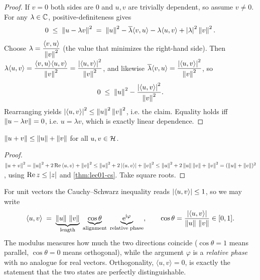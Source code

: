 \begin{proof}
If $v=0$ both sides are $0$ and $u,v$ are trivially dependent, so assume $v\neq0$.
For any $\lambda\in\mathbb{C}$, positive-definiteness gives
\[
  0\;\le\;\left\lVert u-\lambda v \right\rVert^{2}
   \;=\;\left\lVert u \right\rVert^{2}-\overline{\lambda}\langle v,u\rangle-\lambda\langle u,v\rangle+\left\lvert \lambda \right\rvert^{2}\left\lVert v \right\rVert^{2}.
\]
Choose $\lambda=\dfrac{\langle v,u\rangle}{\left\lVert v \right\rVert^{2}}$ (the value that minimizes the
right-hand side). Then $\lambda\langle u,v\rangle=\dfrac{\langle v,u\rangle\langle u,v\rangle}{\left\lVert v \right\rVert^{2}}=\dfrac{\left\lvert \langle u,v\rangle \right\rvert^{2}}{\left\lVert v \right\rVert^{2}}$, and likewise $\overline{\lambda}\langle v,u\rangle=\dfrac{\left\lvert \langle u,v\rangle \right\rvert^{2}}{\left\lVert v \right\rVert^{2}}$, so
\[
  0\;\le\;\left\lVert u \right\rVert^{2}-\frac{\left\lvert \langle u,v\rangle \right\rvert^{2}}{\left\lVert v \right\rVert^{2}}.
\]
Rearranging yields $\left\lvert \langle u,v\rangle \right\rvert^{2}\le\left\lVert u \right\rVert^{2}\left\lVert v \right\rVert^{2}$, i.e.
the claim. Equality holds iff $\left\lVert u-\lambda v \right\rVert=0$, i.e. $u=\lambda v$, which is
exactly linear dependence.
\end{proof}

\begin{corollary}\label{cor:lec01-tri}
$\left\lVert u+v \right\rVert\le\left\lVert u \right\rVert+\left\lVert v \right\rVert$ for all $u,v\in\mathcal{H}$.
\end{corollary}

\begin{proof}
$\left\lVert u+v \right\rVert^{2}=\left\lVert u \right\rVert^{2}+2\,\mathrm{Re}\,\langle u,v\rangle+\left\lVert v \right\rVert^{2}
 \le \left\lVert u \right\rVert^{2}+2\left\lvert \langle u,v\rangle \right\rvert+\left\lVert v \right\rVert^{2}
 \le \left\lVert u \right\rVert^{2}+2\left\lVert u \right\rVert\left\lVert v \right\rVert+\left\lVert v \right\rVert^{2}=(\left\lVert u \right\rVert+\left\lVert v \right\rVert)^{2}$,
using $\mathrm{Re}\,z\le\left\lvert z \right\rvert$ and \cref{thm:lec01-cs}. Take square roots.
\end{proof}

For unit vectors the Cauchy--Schwarz inequality reads $\left\lvert \langle u,v\rangle \right\rvert\le1$,
so we may write
\begin{equation}\label{eq:lec01-geomdecomp}
  \langle u,v\rangle \;=\; \underbrace{\left\lVert u \right\rVert\,\left\lVert v \right\rVert}_{\text{length}}\;
  \underbrace{\cos\theta}_{\text{alignment}}\;\underbrace{\mathrm{e}^{\mathrm{i}\varphi}}_{\text{relative phase}},
  \qquad \cos\theta=\frac{\left\lvert \langle u,v\rangle \right\rvert}{\left\lVert u \right\rVert\,\left\lVert v \right\rVert}\in[0,1].
\end{equation}
The modulus measures how much the two directions coincide ($\cos\theta=1$ means
parallel, $\cos\theta=0$ means orthogonal), while the argument $\varphi$ is a
\emph{relative phase} with no analogue for real vectors. Orthogonality,
$\langle u,v\rangle=0$, is exactly the statement that the two states are perfectly
distinguishable.

